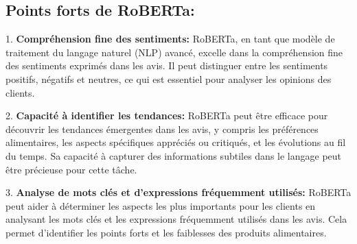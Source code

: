 \subsection{Points forts de RoBERTa:}

1. \textbf{Compréhension fine des sentiments:} RoBERTa, en tant que modèle de traitement du langage naturel (NLP) avancé, excelle dans la compréhension fine des sentiments exprimés dans les avis. Il peut distinguer entre les sentiments positifs, négatifs et neutres, ce qui est essentiel pour analyser les opinions des clients.

2. \textbf{Capacité à identifier les tendances:} RoBERTa peut être efficace pour découvrir les tendances émergentes dans les avis, y compris les préférences alimentaires, les aspects spécifiques appréciés ou critiqués, et les évolutions au fil du temps. Sa capacité à capturer des informations subtiles dans le langage peut être précieuse pour cette tâche.

3. \textbf{Analyse de mots clés et d'expressions fréquemment utilisés:} RoBERTa peut aider à déterminer les aspects les plus importants pour les clients en analysant les mots clés et les expressions fréquemment utilisés dans les avis. Cela permet d'identifier les points forts et les faiblesses des produits alimentaires.
